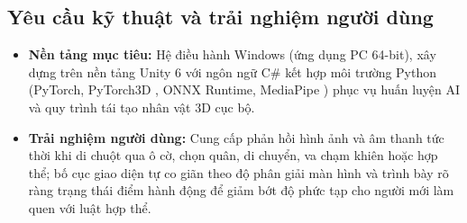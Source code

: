 \subsection{Yêu cầu kỹ thuật và trải nghiệm người dùng}
\begin{itemize}
    \item \textbf{Nền tảng mục tiêu:} Hệ điều hành Windows (ứng dụng PC 64-bit), xây dựng trên nền tảng Unity 6 \cite{unity6} với ngôn ngữ C\# kết hợp môi trường Python (PyTorch, PyTorch3D \cite{pytorch3d}, ONNX Runtime, MediaPipe \cite{mediapipe}) phục vụ huấn luyện AI và quy trình tái tạo nhân vật 3D cục bộ.
    \item \textbf{Trải nghiệm người dùng:} Cung cấp phản hồi hình ảnh và âm thanh tức thời khi di chuột qua ô cờ, chọn quân, di chuyển, va chạm khiên hoặc hợp thể; bố cục giao diện tự co giãn theo độ phân giải màn hình và trình bày rõ ràng trạng thái điểm hành động để giảm bớt độ phức tạp cho người mới làm quen với luật hợp thể.
\end{itemize}
